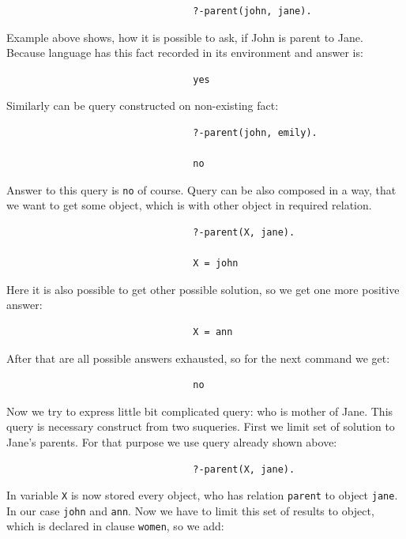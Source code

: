 \documentclass[11pt,twoside,a4paper]{book}
\begin{document}
\begin{verbatim}
                                 ?-parent(john, jane).
\end{verbatim}
Example above shows, how it is possible to ask, if John is parent to Jane.
Because language has this fact recorded in its environment and answer is:

\begin{verbatim}                            
                                 yes
\end{verbatim}
Similarly can be query constructed on non-existing fact:

\begin{verbatim}
                                 ?-parent(john, emily).
                            
                                 no
\end{verbatim}
Answer to this query is \verb|no| of course. Query can be also composed in a
way, that we want to get some object, which is with other object in
required relation.

\begin{verbatim}
                                 ?-parent(X, jane).
                            
                                 X = john
\end{verbatim}
Here it is also possible to get other possible solution, so we get one more
positive answer:

\begin{verbatim}
                                 X = ann
\end{verbatim}
After that are all possible answers exhausted, so for the next command we get:

\begin{verbatim}
                                 no
\end{verbatim}
Now we try to express little bit complicated query: who is mother of Jane. This
query is necessary construct from two suqueries. First we limit set of solution
to Jane's parents. For that purpose we use query already shown above:

\begin{verbatim}
                                 ?-parent(X, jane).
\end{verbatim}




In variable \verb|X| is now stored every object, who has relation \verb|parent|
to object \verb|jane|. In our case \verb|john| and \verb|ann|. Now we have to
limit this set of results to object, which is declared in clause \verb|women|,
so we add:
\end{document}
